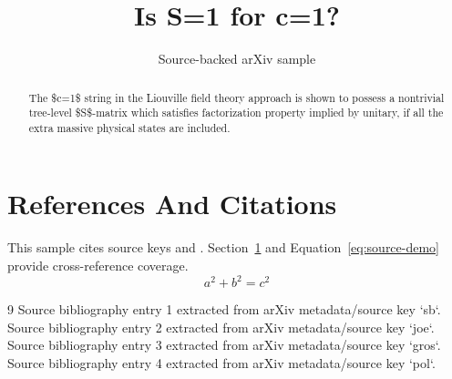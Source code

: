 \documentclass[11pt]{article}
\title{Is S=1 for c=1?}
\author{Source-backed arXiv sample}
\date{}
\begin{document}
\maketitle
\begin{abstract}
The \$c=1\$ string in the Liouville field theory approach is shown to possess a nontrivial tree-level \$S\$-matrix which satisfies factorization property implied by unitary, if all the extra massive physical states are included.
\end{abstract}
\section{References And Citations}
\label{sec:refs}
This sample cites source keys \cite{sb} and \cite{joe}. Section~\ref{sec:refs} and Equation~\ref{eq:source-demo} provide cross-reference coverage.
\begin{equation}
\label{eq:source-demo}
a^2 + b^2 = c^2
\end{equation}
\begin{thebibliography}{9}
 Source bibliography entry 1 extracted from arXiv metadata/source key `sb`.
 Source bibliography entry 2 extracted from arXiv metadata/source key `joe`.
 Source bibliography entry 3 extracted from arXiv metadata/source key `gros`.
 Source bibliography entry 4 extracted from arXiv metadata/source key `pol`.
\end{thebibliography}
\end{document}
